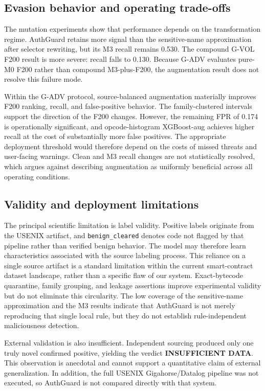 \documentclass[conference]{IEEEtran}
\begin{document}
\subsection{Evasion behavior and operating trade-offs}

The mutation experiments show that performance depends on the transformation regime. AuthGuard retains more signal than the sensitive-name approximation after selector rewriting, but its M3 recall remains 0.530. The compound G-VOL F200 result is more severe: recall falls to 0.130. Because G-ADV evaluates pure-M0 F200 rather than compound M3-plus-F200, the augmentation result does not resolve this failure mode.

Within the G-ADV protocol, source-balanced augmentation materially improves F200 ranking, recall, and false-positive behavior. The family-clustered intervals support the direction of the F200 changes. However, the remaining FPR of 0.174 is operationally significant, and opcode-histogram XGBoost-aug achieves higher recall at the cost of substantially more false positives. The appropriate deployment threshold would therefore depend on the costs of missed threats and user-facing warnings. Clean and M3 recall changes are not statistically resolved, which argues against describing augmentation as uniformly beneficial across all operating conditions.

\subsection{Validity and deployment limitations}

The principal scientific limitation is label validity. Positive labels originate from the USENIX artifact, and \texttt{benign\_cleared} denotes code not flagged by that pipeline rather than verified benign behavior. The model may therefore learn characteristics associated with the source labeling process. This reliance on a single source artifact is a standard limitation within the current smart-contract dataset landscape, rather than a specific flaw of our system. Exact-bytecode quarantine, family grouping, and leakage assertions improve experimental validity but do not eliminate this circularity. The low coverage of the sensitive-name approximation and the M3 results indicate that AuthGuard is not merely reproducing that single local rule, but they do not establish rule-independent maliciousness detection.

External validation is also insufficient. Independent sourcing produced only one truly novel confirmed positive, yielding the verdict \textbf{INSUFFICIENT DATA}. This observation is anecdotal and cannot support a quantitative claim of external generalization. In addition, the full USENIX Gigahorse/Datalog pipeline was not executed, so AuthGuard is not compared directly with that system.
\end{document}
